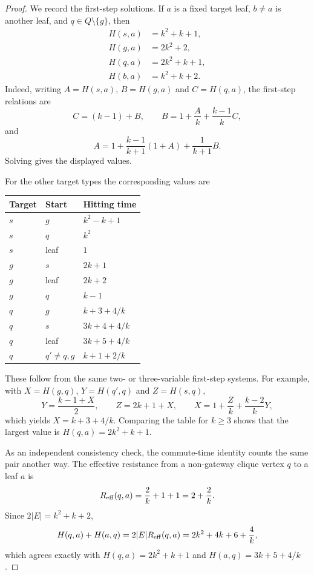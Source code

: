 \documentclass[11pt]{article}
\begin{document}
\begin{proof}
We record the first-step solutions.  If $a$ is a fixed target leaf, $b\ne a$
is another leaf, and $q\in Q\setminus\{g\}$, then
\begin{align*}
 H(s,a)&=k^2+k+1,\\
 H(g,a)&=2k^2+2,\\
 H(q,a)&=2k^2+k+1,\\
 H(b,a)&=k^2+k+2.
\end{align*}
Indeed, writing $A=H(s,a)$, $B=H(g,a)$ and $C=H(q,a)$, the first-step
relations are
\[
 C=(k-1)+B,
 \qquad
 B=1+\frac{A}{k}+\frac{k-1}{k}C,
\]
and
\[
 A=1+\frac{k-1}{k+1}(1+A)+\frac{1}{k+1}B.
\]
Solving gives the displayed values.

For the other target types the corresponding values are
\begin{center}
\begin{tabular}{@{}lll@{}}
\toprule
Target & Start & Hitting time \\
\midrule
$s$ & $g$ & $k^2-k+1$ \\
$s$ & $q$ & $k^2$ \\
$s$ & leaf & $1$ \\
\addlinespace
$g$ & $s$ & $2k+1$ \\
$g$ & leaf & $2k+2$ \\
$g$ & $q$ & $k-1$ \\
\addlinespace
$q$ & $g$ & $k+3+4/k$ \\
$q$ & $s$ & $3k+4+4/k$ \\
$q$ & leaf & $3k+5+4/k$ \\
$q$ & $q'\ne q,g$ & $k+1+2/k$ \\
\bottomrule
\end{tabular}
\end{center}
These follow from the same two- or three-variable first-step systems.  For
example, with $X=H(g,q)$, $Y=H(q',q)$ and $Z=H(s,q)$,
\[
 Y=\frac{k-1+X}{2},\qquad
 Z=2k+1+X,\qquad
 X=1+\frac{Z}{k}+\frac{k-2}{k}Y,
\]
which yields $X=k+3+4/k$.  Comparing the table for $k\ge3$ shows that the
largest value is $H(q,a)=2k^2+k+1$.

As an independent consistency check, the commute-time identity counts the
same pair another way.  The effective resistance from a non-gateway clique
vertex $q$ to a leaf $a$ is
\[
 R_{\rm eff}(q,a)=\frac{2}{k}+1+1=2+\frac2k.
\]
Since $2|E|=k^2+k+2$,
\[
 H(q,a)+H(a,q)
 =2|E|R_{\rm eff}(q,a)
 =2k^2+4k+6+\frac4k,
\]
which agrees exactly with
$H(q,a)=2k^2+k+1$ and $H(a,q)=3k+5+4/k$.
\end{proof}
\end{document}
